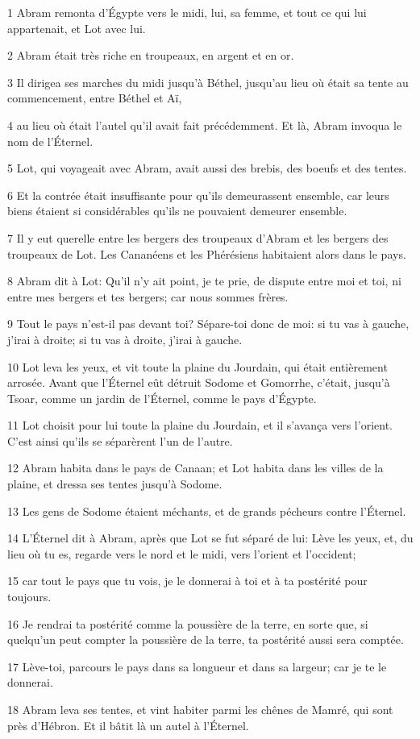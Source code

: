 \par 1 Abram remonta d'Égypte vers le midi, lui, sa femme, et tout ce qui lui appartenait, et Lot avec lui.
\par 2 Abram était très riche en troupeaux, en argent et en or.
\par 3 Il dirigea ses marches du midi jusqu'à Béthel, jusqu'au lieu où était sa tente au commencement, entre Béthel et Aï,
\par 4 au lieu où était l'autel qu'il avait fait précédemment. Et là, Abram invoqua le nom de l'Éternel.
\par 5 Lot, qui voyageait avec Abram, avait aussi des brebis, des boeufs et des tentes.
\par 6 Et la contrée était insuffisante pour qu'ils demeurassent ensemble, car leurs biens étaient si considérables qu'ils ne pouvaient demeurer ensemble.
\par 7 Il y eut querelle entre les bergers des troupeaux d'Abram et les bergers des troupeaux de Lot. Les Cananéens et les Phérésiens habitaient alors dans le pays.
\par 8 Abram dit à Lot: Qu'il n'y ait point, je te prie, de dispute entre moi et toi, ni entre mes bergers et tes bergers; car nous sommes frères.
\par 9 Tout le pays n'est-il pas devant toi? Sépare-toi donc de moi: si tu vas à gauche, j'irai à droite; si tu vas à droite, j'irai à gauche.
\par 10 Lot leva les yeux, et vit toute la plaine du Jourdain, qui était entièrement arrosée. Avant que l'Éternel eût détruit Sodome et Gomorrhe, c'était, jusqu'à Tsoar, comme un jardin de l'Éternel, comme le pays d'Égypte.
\par 11 Lot choisit pour lui toute la plaine du Jourdain, et il s'avança vers l'orient. C'est ainsi qu'ils se séparèrent l'un de l'autre.
\par 12 Abram habita dans le pays de Canaan; et Lot habita dans les villes de la plaine, et dressa ses tentes jusqu'à Sodome.
\par 13 Les gens de Sodome étaient méchants, et de grands pécheurs contre l'Éternel.
\par 14 L'Éternel dit à Abram, après que Lot se fut séparé de lui: Lève les yeux, et, du lieu où tu es, regarde vers le nord et le midi, vers l'orient et l'occident;
\par 15 car tout le pays que tu vois, je le donnerai à toi et à ta postérité pour toujours.
\par 16 Je rendrai ta postérité comme la poussière de la terre, en sorte que, si quelqu'un peut compter la poussière de la terre, ta postérité aussi sera comptée.
\par 17 Lève-toi, parcours le pays dans sa longueur et dans sa largeur; car je te le donnerai.
\par 18 Abram leva ses tentes, et vint habiter parmi les chênes de Mamré, qui sont près d'Hébron. Et il bâtit là un autel à l'Éternel.

